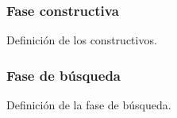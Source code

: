 \subsubsection{Fase constructiva}
Definición de los constructivos.

\subsubsection{Fase de búsqueda}
Definición de la fase de búsqueda.



